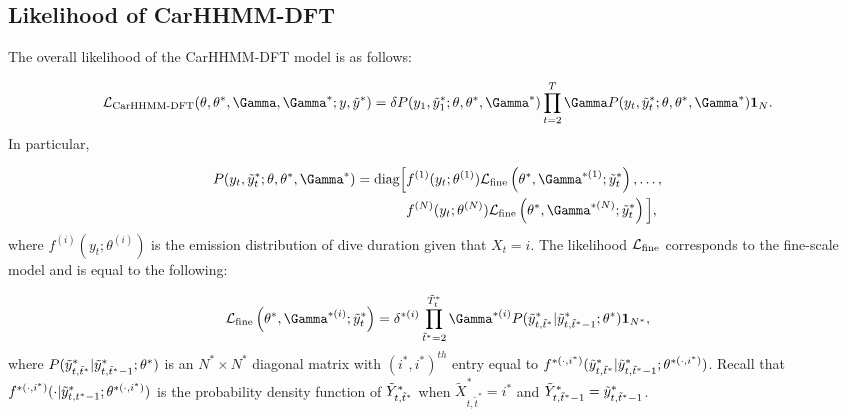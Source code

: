 \subsection{Likelihood of CarHHMM-DFT}

The overall likelihood of the CarHHMM-DFT model is as follows:

\[\calL_{\text{CarHHMM-DFT}}(\theta,\theta^*,\Gamma,\Gamma^*;y,\z) = \delta P(y_1,\z_1;\theta,\theta^*,\Gamma^*) \prod_{t=2}^T \Gamma P(y_t,\z_t;\theta,\theta^*,\Gamma^*) \mathbf{1}_N.\]
%
In particular,

\begin{align*}
P(y_t,\z_t;\theta,\theta^*,\Gamma^*)  = \text{diag}\Big[&f^{(1)}(y_t;\theta^{(1)})\calL_{\text{fine}}\left(\theta^*,\Gamma^{*(1)};\z_t\right), \ldots , \\
&f^{(N)}(y_t;\theta^{(N)})\calL_{\text{fine}}\left(\theta^*,\Gamma^{*(N)};\z_t\right) \Big],
\end{align*}
%
where $f^{(i)}(y_t;\theta^{(i)})$ is the emission distribution of dive duration given that $X_t = i$. The likelihood $\mathcal{L}_{\text{fine}}$ corresponds to the fine-scale model and is equal to the following:

\[\calL_{\text{fine}}\left(\theta^{*},\Gamma^{*(i)};\z_t\right) = \delta^{*(i)} \prod_{\tilde t^* = 2}^{\tilde T^*_t} \Gamma^{*(i)} P(\z_{t,\tilde t^*}|\z_{t,\tilde t^*-1};\theta^*) \mathbf{1}_{N^*},\]
%
where $P(\tilde{y}^*_{t,\tilde t^*}|\tilde{y}^*_{t,\tilde t^*-1};\theta^*)$ is an $N^* \times N^*$ diagonal matrix with $(i^*,i^*)^{th}$ entry equal to $f^{*(\cdot,i^*)}(\tilde{y}^*_{t,\tilde t^*}|\tilde{y}^*_{t,\tilde t^*-1}; \theta^{*(\cdot,i^*)})$.
%
Recall that $f^{*(\cdot,i^*)}(\cdot|\tilde{y}^*_{t,t^*-1}; \theta^{*(\cdot,i^*)})$ is the probability density function of $\tilde{Y}^*_{t,\tilde t^*}$ when $\tilde X^*_{t,\tilde t^*} = i^*$ and $\tilde{Y}^*_{t,\tilde t^*-1} = \tilde{y}^*_{t,\tilde t^*-1}$.



